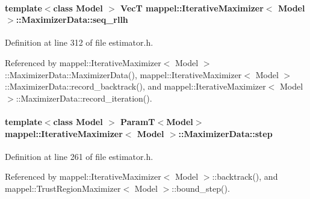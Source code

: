 \paragraph[{\texorpdfstring{seq\+\_\+rllh}{seq_rllh}}]{\setlength{\rightskip}{0pt plus 5cm}template$<$class Model $>$ {\bf VecT} {\bf mappel\+::\+Iterative\+Maximizer}$<$ Model $>$\+::Maximizer\+Data\+::seq\+\_\+rllh\hspace{0.3cm}{\ttfamily [protected]}}\hypertarget{classmappel_1_1IterativeMaximizer_1_1MaximizerData_aaf6e3749e8bf4e8714bac4a48902a4cb}{}\label{classmappel_1_1IterativeMaximizer_1_1MaximizerData_aaf6e3749e8bf4e8714bac4a48902a4cb}


Definition at line 312 of file estimator.\+h.



Referenced by mappel\+::\+Iterative\+Maximizer$<$ Model $>$\+::\+Maximizer\+Data\+::\+Maximizer\+Data(), mappel\+::\+Iterative\+Maximizer$<$ Model $>$\+::\+Maximizer\+Data\+::record\+\_\+backtrack(), and mappel\+::\+Iterative\+Maximizer$<$ Model $>$\+::\+Maximizer\+Data\+::record\+\_\+iteration().

\paragraph[{\texorpdfstring{step}{step}}]{\setlength{\rightskip}{0pt plus 5cm}template$<$class Model $>$ {\bf ParamT}$<$Model$>$ {\bf mappel\+::\+Iterative\+Maximizer}$<$ Model $>$\+::Maximizer\+Data\+::step}\hypertarget{classmappel_1_1IterativeMaximizer_1_1MaximizerData_af592d029ed46c5ec9bedd2291db12920}{}\label{classmappel_1_1IterativeMaximizer_1_1MaximizerData_af592d029ed46c5ec9bedd2291db12920}


Definition at line 261 of file estimator.\+h.



Referenced by mappel\+::\+Iterative\+Maximizer$<$ Model $>$\+::backtrack(), and mappel\+::\+Trust\+Region\+Maximizer$<$ Model $>$\+::bound\+\_\+step().

